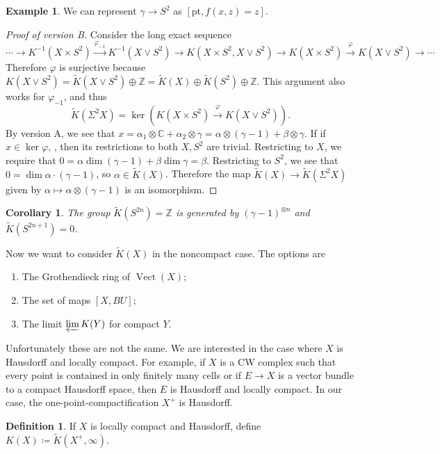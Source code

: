 \documentclass[leqno, openany]{memoir}
\newtheorem{cor}[thm]{Corollary}
\theoremstyle{definition}
\newtheorem{defn}[thm]{Definition}
\newtheorem{exm}[thm]{Example}
\theoremstyle{remark}
\theoremstyle{plain}
\theoremstyle{definition}
\theoremstyle{remark}
\newcommand{\C}{\mathbb{C}}
\newcommand{\Z}{\mathbb{Z}}
\newcommand{\mr}[1]{\mathrm{#1}}
\newcommand{\wt}[1]{\widetilde{#1}}
\DeclareMathOperator{\Vect}{Vect}
\begin{document}
\begin{exm} We can represent $\gamma \to S^2$ as $[\mr{pt}, f(x,z) = z]$.
\end{exm}

\begin{proof}[Proof of version B] Consider the long exact sequence \[ \cdots
\to K^{-1}(X \times S^2) \xrightarrow{\varphi_{-1}} K^{-1}(X \vee S^2) \to K(X
\times S^2, X \vee S^2) \to K(X \times S^2) \xrightarrow{\varphi} K(X \vee S^2)
\to \cdots \] Therefore $\varphi$ is surjective because $K(X \vee S^2) =
\wt{K}(X \vee S^2) \oplus \Z = \wt{K}(X) \oplus \wt{K}(S^2) \oplus \Z$. This
argument also works for $\varphi_{-1}$, and thus \[ \wt{K}(\Sigma^2 X) = \ker
(K(X \times S^2) \xrightarrow{\varphi} K(X \vee S^2)). \] By version A, we see
that $x = \alpha_1 \otimes \C + \alpha_2 \otimes \gamma = \alpha \otimes
(\gamma-1) + \beta \otimes \gamma$. If if $x \in \ker \varphi$, , then its
restrictions to both $X, S^2$ are trivial. Restricting to $X$, we require that
$0 = \alpha \dim(\gamma-1) + \beta \dim \gamma = \beta$. Restricting to $S^2$,
we see that $0 = \dim \alpha \cdot (\gamma-1)$, so $\alpha \in \wt{K}(X)$.
Therefore the map $\wt{K}(X) \to \wt{K}(\Sigma^2 X)$ given by $\alpha \mapsto
\alpha \otimes (\gamma-1)$ is an isomorphism.  \end{proof}

\begin{cor} The group $\wt{K}(S^{2n}) = \Z$ is generated by
${(\gamma-1)}^{\otimes n}$ and $\wt{K}(S^{2n+1}) = 0$.  \end{cor}

Now we want to consider $\wt{K}(X)$ in the noncompact case. The options are
\begin{enumerate} \item The Grothendieck ring of $\Vect(X)$; \item The set of
maps $[X, BU]$; \item The limit $\varprojlim K(Y)$ for compact $Y$.
\end{enumerate}

Unfortunately these are not the same. We are interested in the case where $X$
is Hausdorff and locally compact. For example, if $X$ is a CW complex such that
every point is contained in only finitely many cells or if $E \to X$ is a
vector bundle to a compact Hausdorff space, then $E$ is Hausdorff and locally
compact. In our case, the one-point-compactification $X^+$ is Hausdorff.

\begin{defn} If $X$ is locally compact and Hausdorff, define $K(X) \coloneqq
\wt{K}(X^+, \infty)$.  \end{defn}
\end{document}
